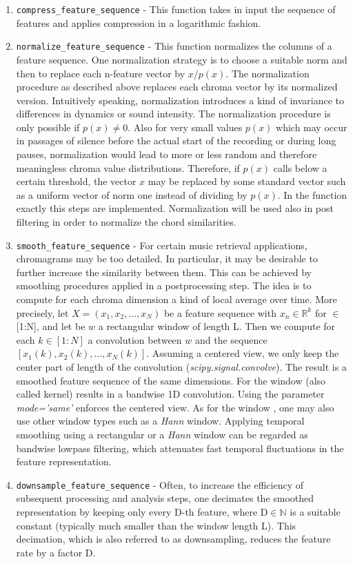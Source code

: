 \documentclass{article}
\begin{document}
\begin{enumerate}
	\item \verb|compress_feature_sequence| - This function takes in input the sequence of features and applies compression in a logarithmic fashion.
	\item \verb|normalize_feature_sequence| - This function normalizes the columns of a feature sequence. One normalization strategy is to choose a suitable norm  and then to replace each n-feature vector  by $x/p(x)$. The normalization procedure as described above replaces each chroma vector by its normalized version. Intuitively speaking, normalization introduces a kind of invariance to differences in dynamics or sound intensity. The normalization procedure is only possible if $p(x) \neq 0$. Also for very small values $p(x)$ which may occur in passages of silence before the actual start of the recording or during long pauses, normalization would lead to more or less random and therefore meaningless chroma value distributions. Therefore, if $p(x)$ calls below a certain threshold, the vector $x$ may be replaced by some standard vector such as a uniform vector of norm one instead of dividing by $p(x)$. In the function exactly this steps are implemented. Normalization will be used also in post filtering in order to normalize the chord similarities.
	\item \verb|smooth_feature_sequence| - For certain music retrieval applications, chromagrams may be too detailed. In particular, it may be desirable to further increase the similarity between them. This can be achieved by smoothing procedures applied in a postprocessing step. The idea is to compute for each chroma dimension a kind of local average over time. More precisely, let \(X=(x_1,x_2,...,x_N)\) be a feature sequence with $x_n \in \mathbb{R}^k$ for $\in$[1:N], and let be $w$ a rectangular window  of length L. Then we compute for each $k \in[1:N]$ a convolution between $w$ and the sequence $[x_1(k),x_2(k),...,x_N(k)]$. Assuming a centered view, we only keep the center part of length of the convolution (\textit{scipy.signal.convolve}). The result is a smoothed feature sequence of the same dimensions. For the window (also called kernel) results in a bandwise 1D convolution. Using the parameter \textit{mode='same'} enforces the centered view. As for the window , one may also use other window types such as a \textit{Hann }window. Applying temporal smoothing using a rectangular or a \textit{Hann} window can be regarded as bandwise lowpass filtering, which attenuates fast temporal fluctuations in the feature representation.
	\item \verb|downsample_feature_sequence| - Often, to increase the efficiency of subsequent processing and analysis steps, one decimates the smoothed representation by keeping only every D-th feature, where D$\in\mathbb{N}$ is a suitable constant (typically much smaller than the window length L). This decimation, which is also referred to as downsampling, reduces the feature rate by a factor D.
\end{enumerate}
\end{document}

